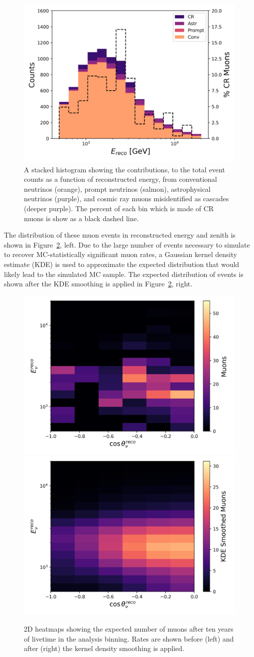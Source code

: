\documentclass[main.tex]{subfiles}
\begin{document}
\begin{figure}
    \centering
    \includegraphics[width=0.8\linewidth]{figures/expectation_stacked.png}
    \caption{A stacked histogram showing the contributions,  to the total event counts as a function of reconstructed energy, from conventional neutrinos (orange), prompt neutrinos (salmon), astrophysical neutrinos (purple), and cosmic ray muons misidentified as cascades (deeper purple). The percent of each bin which is made of CR muons is show as a black dashed line.}\label{fig:muonperc}
\end{figure}

The distribution of these muon events in reconstructed energy and zenith is shown in Figure~\ref{fig:muonmuon}, left.
Due to the large number of events necessary to simulate to recover MC-statistically significant muon rates, a Gaussian kernel density estimate (KDE) is used to approximate the expected distribution that would likely lead to the simulated MC sample. 
The expected distribution of events is shown after the KDE smoothing is applied in Figure~\ref{fig:muonmuon}, right. 

\begin{figure}
    \centering
    \includegraphics[width=0.45\linewidth]{figures/muons_nokde.png}%
    \includegraphics[width=0.45\linewidth]{figures/kde_muons.png}
    \caption{2D heatmaps showing the expected number of muons after ten years of livetime in the analysis binning. Rates are shown before (left) and after (right) the kernel density smoothing is applied.}\label{fig:muonmuon}
\end{figure}
\end{document}
